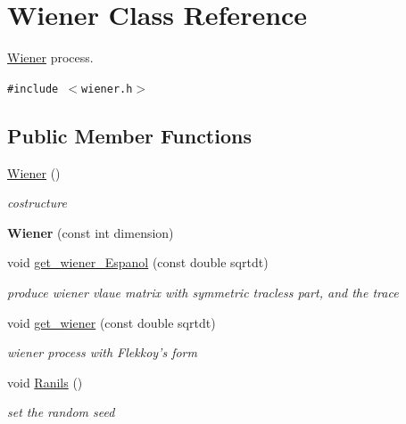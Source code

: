 \hypertarget{classWiener}{
\section{Wiener Class Reference}
\label{classWiener}
}
\hyperlink{classWiener}{Wiener} process.  


{\tt \#include $<$wiener.h$>$}

\subsection*{Public Member Functions}
\begin{CompactItemize}
\item 
\hypertarget{classWiener_9b2daa0e357c11b963463e6c2a510ad1}{
\hyperlink{classWiener_9b2daa0e357c11b963463e6c2a510ad1}{Wiener} ()}
\label{classWiener_9b2daa0e357c11b963463e6c2a510ad1}

\begin{CompactList}\small\item\em costructure \item\end{CompactList}\item 
\hypertarget{classWiener_454f6ab52cf050daf682fa6f374504ea}{
\textbf{Wiener} (const int dimension)}
\label{classWiener_454f6ab52cf050daf682fa6f374504ea}

\item 
\hypertarget{classWiener_9bf2a13de68b15f52e6b3ff5a9c485b6}{
void \hyperlink{classWiener_9bf2a13de68b15f52e6b3ff5a9c485b6}{get\_\-wiener\_\-Espanol} (const double sqrtdt)}
\label{classWiener_9bf2a13de68b15f52e6b3ff5a9c485b6}

\begin{CompactList}\small\item\em produce wiener vlaue matrix with symmetric tracless part, and the trace \item\end{CompactList}\item 
\hypertarget{classWiener_be754cfa9c89ec2e405126f26997e0f0}{
void \hyperlink{classWiener_be754cfa9c89ec2e405126f26997e0f0}{get\_\-wiener} (const double sqrtdt)}
\label{classWiener_be754cfa9c89ec2e405126f26997e0f0}

\begin{CompactList}\small\item\em wiener process with Flekkoy's form \item\end{CompactList}\item 
\hypertarget{classWiener_2fb89a7b43c2d6378ff6698614907098}{
void \hyperlink{classWiener_2fb89a7b43c2d6378ff6698614907098}{Ranils} ()}
\label{classWiener_2fb89a7b43c2d6378ff6698614907098}

\begin{CompactList}\small\item\em set the random seed \item\end{CompactList}\end{CompactItemize}
